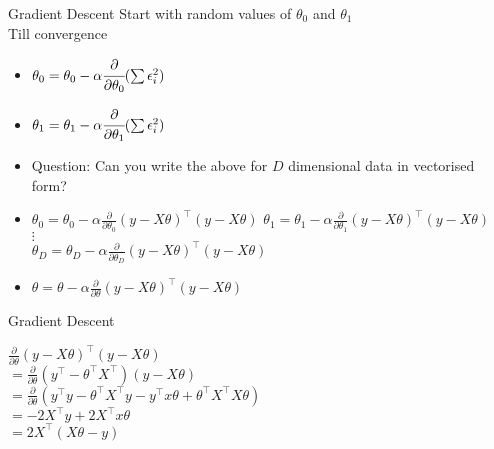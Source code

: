 \documentclass{beamer}
\begin{document}
\begin{frame}{Gradient Descent}
Start with random values of $\theta_{0}$ and $\theta_{1}$\\
Till convergence
\begin{itemize}[<+->]
	\item $\theta_{0} = \theta_{0} - \alpha\cfrac{\partial}{\partial \theta_{0}} (\sum \epsilon_{i}^{2}) $
	\item $\theta_{1} = \theta_{1} - \alpha \cfrac{\partial}{\partial \theta_{1}} (\sum \epsilon_{i}^{2}) $
	\item Question: Can you write the above for $D$ dimensional data in vectorised form?
	\item	\(\theta_{0}=\theta_{0}-\alpha \frac{\partial}{\partial \theta_{0}}\left(y-X\theta\right)^{\top}\left(y-X\theta\right)\)
	\(\theta_{1}=\theta_{1}-\alpha \frac{\partial}{\partial \theta_{1}}\left(y-X\theta\right)^{\top}\left(y-X\theta\right)\) 
	\\ $\vdots$
	\\	\(\theta_{D}=\theta_{D}-\alpha \frac{\partial}{\partial \theta_{D}}\left(y-X\theta\right)^{\top}\left(y-X\theta\right)\)
	\item \(\theta=\theta - \alpha \frac{\partial}{\partial \theta}\left(y-X\theta\right)^{\top}\left(y-X\theta\right)\) 

\end{itemize}
\end{frame}

\begin{frame}{Gradient Descent}


\(\frac{\partial}{\partial \theta}(y-X \theta)^{\top}(y-X \theta)\)
\\ \(=\frac{\partial}{\partial \theta}\left(y^{\top}-\theta^{\top} X^{\top}\right)(y-X \theta)\)
\\ \(=\frac{\partial}{\partial \theta}\left(y^{\top} y-\theta^{\top} X^{\top} y-y^{\top} x \theta+\theta^{\top} X^{\top} X \theta\right)\)
\\ \(=-2 X^{\top} y+2 X^{\top} x \theta\)
\\ \(=2 X^{\top}(X \theta-y)\)
	

\end{frame}
\end{document}
